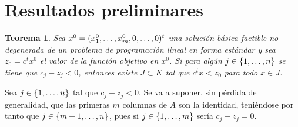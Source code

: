 \documentclass[11pt]{report}
\makeatletter
\renewenvironment{proof}[1][\proofname]{\par
  \pushQED{\qed}%
  \normalfont \topsep\z@skip %
  \trivlist
  \item[\hskip\labelsep
        \itshape
    #1\@addpunct{.}]\ignorespaces
}{%
  \popQED\endtrivlist\@endpefalse
}
\theoremstyle{mytheorem}
\newtheorem{theorem}{Teorema}
\theoremstyle{mydefinition}
\theoremstyle{myexample}
\let\oldproofname=\proofname
\renewcommand{\proofname}{\rm\bf{\oldproofname}}}
\newenvironment{ctheorem} %
  {\begin{mdframed}[
        linewidth=3pt,
        linecolor=c2,
        bottomline=false,
        topline=false,
        rightline=false,
        innerrightmargin=0pt,
        innertopmargin=0pt,
        innerbottommargin=0pt,
        innerleftmargin=1em,
        skipabove=\baselineskip]
    \begin{theorem}}
  {\end{theorem}\end{mdframed}}
\makeatother
\begin{document}
\section{Resultados preliminares}

\begin{ctheorem}
\label{teo2.1.}
Sea $x^0 = (x^0_1,\mathellipsis,x_m^0,0,\mathellipsis,0)^t$ una solución básica-factible no degenerada de un problema de programación lineal en forma estándar y sea $z_0 = c^tx^0$ el valor de la función objetivo en $x^0$. Si para algún $j \in \{1,\mathellipsis,n\}$ se tiene que $c_j-z_j < 0$, entonces existe $J \subset K$ tal que $c^tx < z_0$ para todo $x \in J$.
\end{ctheorem}

\begin{proof}
Sea $j \in \{1,\mathellipsis,n\}$ tal que $c_j-z_j<0$. Se va a suponer, sin pérdida de generalidad, que las primeras $m$ columnas de $A$ son la identidad, teniéndose por tanto que $j \in \{m+1,\mathellipsis,n\}$, pues si $j \in \{1,\mathellipsis,m\}$ sería $c_j-z_j=0$. 


\end{proof}
\end{document}
